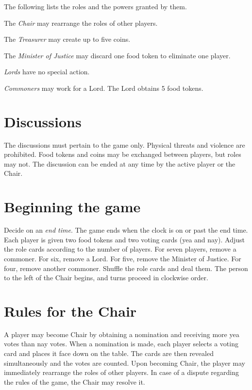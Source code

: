 \documentclass[12pt,a4paper,twocolumn]{article}
\newcommand{\lessspace}
{
\setlength{\itemsep}{0pt}
\setlength{\parskip}{0pt}
\setlength{\parsep}{0pt}
}
\newenvironment{lessdescription}
{
\begin{description}
\lessspace
}
{
\end{description}
}
\begin{document}
The following lists the roles and the powers granted by them.

\begin{lessdescription}
\item[The \textit{Chair}] may rearrange the roles of other players.
\item[The \textit{Treasurer}] may create up to five coins.
\item[The \textit{Minister of Justice}] may discard one food token to eliminate one player.
\item[\textit{Lords}] have no special action.
\item[\textit{Commoners}] may work for a Lord. The Lord obtains 5 food tokens.
\end{lessdescription}

\section{Discussions}
\label{sec:discussions}

The discussions must pertain to the game only. Physical threats and violence are prohibited. Food tokens and coins may be exchanged between players, but roles may not. The discussion can be ended at any time by the active player or the Chair.

\section{Beginning the game}
Decide on an \textit{end time}. The game ends when the clock is on or past the end time. 
Each player is given two food tokens and two voting cards (yea and nay).
Adjust the role cards according to the number of players.
For seven players, remove a commoner.
For six, remove a Lord.
For five, remove the Minister of Justice.
For four, remove another commoner.
Shuffle the role cards and deal them.
The person to the left of the Chair begins, and turns proceed in clockwise order.

\section{Rules for the Chair}
\label{sec:chairrules}

A player may become Chair by obtaining a nomination and receiving more yea votes than nay votes.
When a nomination is made, each player selects a voting card and places it face down on the table.
The cards are then revealed simultaneously and the votes are counted.
Upon becoming Chair, the player may immediately rearrange the roles of other players.
In case of a dispute regarding the rules of the game, the Chair may resolve it.
\end{document}
